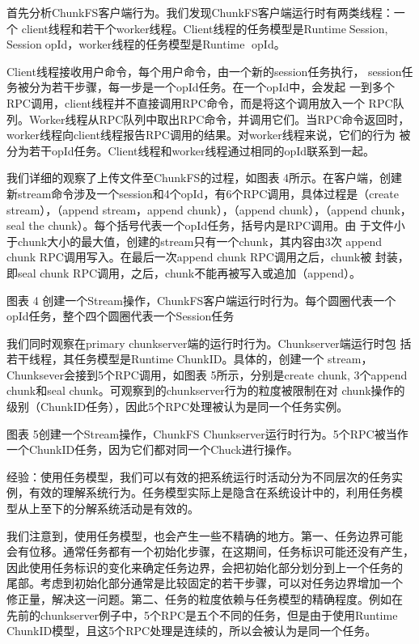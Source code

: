 首先分析ChunkFS客户端行为。我们发现ChunkFS客户端运行时有两类线程：一个
client线程和若干个worker线程。Client线程的任务模型是RuntimeSession,
SessionopId，worker线程的任务模型是Runtime opId。

Client线程接收用户命令，每个用户命令，由一个新的session任务执行，
session任务被分为若干步骤，每一步是一个opId任务。在一个opId中，会发起
一到多个RPC调用，client线程并不直接调用RPC命令，而是将这个调用放入一个
RPC队列。Worker线程从RPC队列中取出RPC命令，并调用它们。当RPC命令返回时，
worker线程向client线程报告RPC调用的结果。对worker线程来说，它们的行为
被分为若干opId任务。Client线程和worker线程通过相同的opId联系到一起。

我们详细的观察了上传文件至ChunkFS的过程，如图表 4所示。在客户端，创建
新stream命令涉及一个session和4个opId，有6个RPC调用，具体过程是（create
stream），（append stream，append chunk），（append chunk），（append
chunk，seal the chunk）。每个括号代表一个opId任务，括号内是RPC调用。由
于文件小于chunk大小的最大值，创建的stream只有一个chunk，其内容由3次
append chunk RPC调用写入。在最后一次append chunk RPC调用之后，chunk被
封装，即seal chunk RPC调用，之后，chunk不能再被写入或追加（append）。

 
图表 4 创建一个Stream操作，ChunkFS客户端运行时行为。每个圆圈代表一个
opId任务，整个四个圆圈代表一个Session任务


我们同时观察在primary chunkserver端的运行时行为。Chunkserver端运行时包
括若干线程，其任务模型是RuntimeChunkID。具体的，创建一个
stream，Chunksever会接到5个RPC调用，如图表 5所示，分别是create chunk,
3个append chunk和seal chunk。可观察到的chunkserver行为的粒度被限制在对
chunk操作的级别（ChunkID任务），因此5个RPC处理被认为是同一个任务实例。

 
图表 5创建一个Stream操作，ChunkFS Chunkserver运行时行为。5个RPC被当作
一个ChunkID任务，因为它们都对同一个Chuck进行操作。


经验：使用任务模型，我们可以有效的把系统运行时活动分为不同层次的任务实
例，有效的理解系统行为。任务模型实际上是隐含在系统设计中的，利用任务模
型从上至下的分解系统活动是有效的。

我们注意到，使用任务模型，也会产生一些不精确的地方。第一、任务边界可能
会有位移。通常任务都有一个初始化步骤，在这期间，任务标识可能还没有产生，
因此使用任务标识的变化来确定任务边界，会把初始化部分划分到上一个任务的
尾部。考虑到初始化部分通常是比较固定的若干步骤，可以对任务边界增加一个
修正量，解决这一问题。第二、任务的粒度依赖与任务模型的精确程度。例如在
先前的chunkserver例子中，5个RPC是五个不同的任务，但是由于使用Runtime
ChunkID模型，且这5个RPC处理是连续的，所以会被认为是同一个任务。


